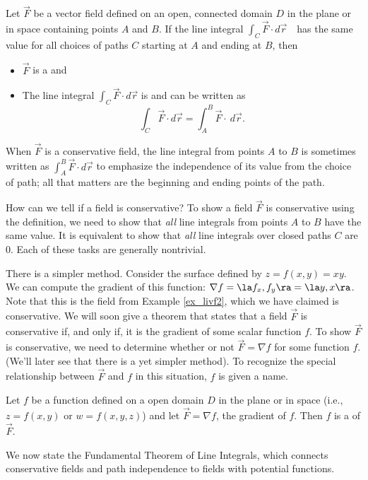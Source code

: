 {Let $\vec F$ be a vector field defined on an open, connected domain $D$ in the plane or in space  containing points $A$ and $B$. If the line integral
$\int_C \vec F\cdot d\vec r$\ \ has the same value for all choices of paths $C$ starting at $A$ and ending at $B$, then
\begin{itemize}
	\item $\vec F$ is a  and
	\item	The line integral $\int_C \vec F\cdot d\vec r$ is  and can be written as $$\int_C \vec F\cdot d\vec r = \int_A^B \vec F\cdot \ d\vec r.$$ 
\end{itemize}
}

When $\vec F$ is a conservative field, the line integral from points $A$ to $B$ is sometimes written as $\int_A^B\vec F\cdot d\vec r$ to emphasize the independence of its value from the choice of path; all that matters are the beginning and ending points of the path.

How can we tell if a field is conservative? To show a field $\vec F$ is conservative using the definition, we need to show that \emph{all} line integrals from points $A$ to $B$ have the same value. It is equivalent to show that \emph{all} line integrals over closed paths $C$ are 0. Each of these tasks are generally nontrivial.

There is a simpler method. Consider the surface defined by $z = f(x,y) = xy$. We can compute the gradient of this function: $\nabla f = \la f_x, f_y\ra = \la y, x\ra$. Note that this is the field from Example \ref{ex_livf2}, which we have claimed is conservative. We will soon give a theorem that states that a field $\vec F$ is conservative if, and only if, it is the gradient of some scalar function $f$. To show $\vec F$ is conservative, we need to determine whether or not $\vec F = \nabla f$ for some function $f$. (We'll later see that there is a yet simpler method). To recognize the special relationship between $\vec F$ and $f$ in this situation, $f$ is given a name.

{Let $f$ be a function defined on a open domain $D$ in the plane or in space (i.e., $z = f(x,y)$ or $w = f(x,y,z)$) and let $\vec F = \nabla f$, the gradient of $f$. Then $f$ is a  of $\vec F$.
}

We now state the Fundamental Theorem of Line Integrals, which connects conservative fields and path independence to fields with potential functions. 

